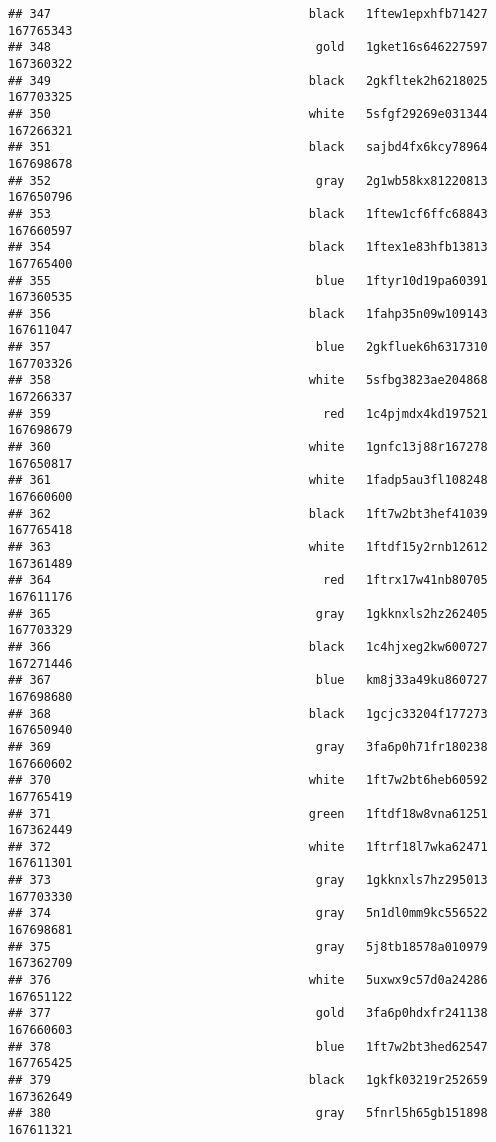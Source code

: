 \documentclass[
]{article}
\begin{document}
\begin{verbatim}
## 347                                    black   1ftew1epxhfb71427 167765343
## 348                                     gold   1gket16s646227597 167360322
## 349                                    black   2gkfltek2h6218025 167703325
## 350                                    white   5sfgf29269e031344 167266321
## 351                                    black   sajbd4fx6kcy78964 167698678
## 352                                     gray   2g1wb58kx81220813 167650796
## 353                                    black   1ftew1cf6ffc68843 167660597
## 354                                    black   1ftex1e83hfb13813 167765400
## 355                                     blue   1ftyr10d19pa60391 167360535
## 356                                    black   1fahp35n09w109143 167611047
## 357                                     blue   2gkfluek6h6317310 167703326
## 358                                    white   5sfbg3823ae204868 167266337
## 359                                      red   1c4pjmdx4kd197521 167698679
## 360                                    white   1gnfc13j88r167278 167650817
## 361                                    white   1fadp5au3fl108248 167660600
## 362                                    black   1ft7w2bt3hef41039 167765418
## 363                                    white   1ftdf15y2rnb12612 167361489
## 364                                      red   1ftrx17w41nb80705 167611176
## 365                                     gray   1gkknxls2hz262405 167703329
## 366                                    black   1c4hjxeg2kw600727 167271446
## 367                                     blue   km8j33a49ku860727 167698680
## 368                                    black   1gcjc33204f177273 167650940
## 369                                     gray   3fa6p0h71fr180238 167660602
## 370                                    white   1ft7w2bt6heb60592 167765419
## 371                                    green   1ftdf18w8vna61251 167362449
## 372                                    white   1ftrf18l7wka62471 167611301
## 373                                     gray   1gkknxls7hz295013 167703330
## 374                                     gray   5n1dl0mm9kc556522 167698681
## 375                                     gray   5j8tb18578a010979 167362709
## 376                                    white   5uxwx9c57d0a24286 167651122
## 377                                     gold   3fa6p0hdxfr241138 167660603
## 378                                     blue   1ft7w2bt3hed62547 167765425
## 379                                    black   1gkfk03219r252659 167362649
## 380                                     gray   5fnrl5h65gb151898 167611321

\end{verbatim}
\end{document}
